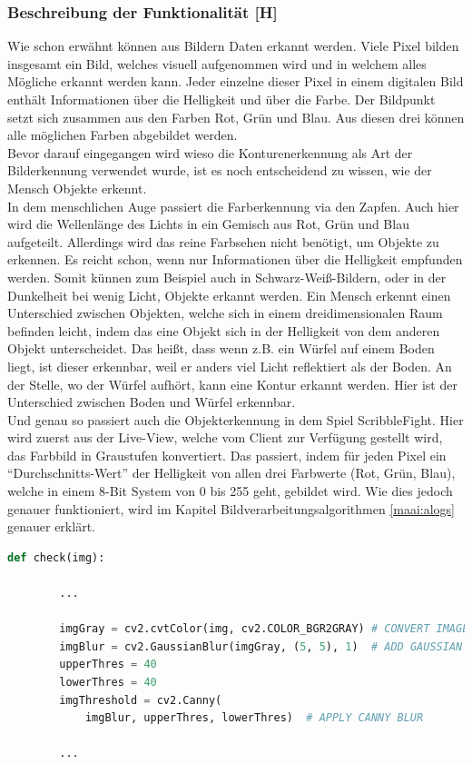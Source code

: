 \subsubsection{Beschreibung der Funktionalität [H]}\label{maai:beschrFunktionalitaet}

Wie schon erwähnt können aus Bildern Daten erkannt werden. Viele Pixel bilden insgesamt ein Bild, welches visuell aufgenommen wird und in welchem alles Mögliche erkannt werden kann. Jeder einzelne dieser Pixel in einem digitalen Bild enthält Informationen über die Helligkeit und über die Farbe. Der Bildpunkt setzt sich zusammen aus den Farben Rot, Grün und Blau. Aus diesen drei können alle möglichen Farben abgebildet werden.
\\
Bevor darauf eingegangen wird wieso die Konturenerkennung als Art der Bilderkennung verwendet wurde, ist es noch entscheidend zu wissen, wie der Mensch Objekte erkennt.
\\
In dem menschlichen Auge passiert die Farberkennung via den Zapfen. Auch hier wird die Wellenlänge des Lichts in ein Gemisch aus Rot, Grün und Blau aufgeteilt. Allerdings wird das reine Farbsehen nicht benötigt, um Objekte zu erkennen. Es reicht schon, wenn nur Informationen über die Helligkeit empfunden werden. Somit künnen zum Beispiel auch in Schwarz-Weiß-Bildern, oder in der Dunkelheit bei wenig Licht, Objekte erkannt werden. Ein Mensch erkennt einen Unterschied zwischen Objekten, welche sich in einem dreidimensionalen Raum befinden leicht, indem das eine Objekt sich in der Helligkeit von dem anderen Objekt unterscheidet. Das heißt, dass wenn z.B. ein Würfel auf einem Boden liegt, ist dieser erkennbar, weil er anders viel Licht reflektiert als der Boden. An der Stelle, wo der Würfel aufhört, kann eine Kontur erkannt werden. Hier ist der Unterschied zwischen Boden und Würfel erkennbar. \cite{sehen}
\\
Und genau so passiert auch die Objekterkennung in dem Spiel ScribbleFight. Hier wird zuerst aus der Live-View, welche vom Client zur Verfügung gestellt wird, das Farbbild in Graustufen konvertiert. Das passiert, indem für jeden Pixel ein ``Durchschnitts-Wert'' der Helligkeit von allen drei Farbwerte (Rot, Grün, Blau), welche in einem 8-Bit System von 0 bis 255 geht, gebildet wird. Wie dies jedoch genauer funktioniert, wird im Kapitel Bildverarbeitungsalgorithmen
\ref{maai:alogs}
genauer erklärt.

\begin{lstlisting}[caption=Alle unnötigen Bilddaten entfernen,language=Python,label=lst:impl:filters]
    def check(img):
        
        ...

        imgGray = cv2.cvtColor(img, cv2.COLOR_BGR2GRAY) # CONVERT IMAGE TO GRAY SCALE
        imgBlur = cv2.GaussianBlur(imgGray, (5, 5), 1)  # ADD GAUSSIAN BLUR
        upperThres = 40
        lowerThres = 40
        imgThreshold = cv2.Canny(
            imgBlur, upperThres, lowerThres)  # APPLY CANNY BLUR
        
        ...
\end{lstlisting}


